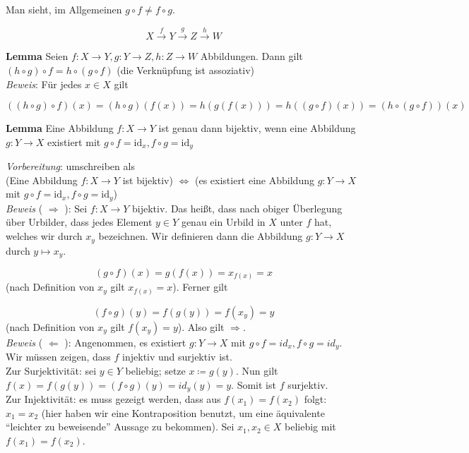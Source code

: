 \documentclass{article}
\begin{document}
Man sieht, im Allgemeinen $g \circ f \ne f \circ g$.

\[
  X \overset{f}\to Y \overset{g}\to Z \overset{h}\to W
\]

\textbf{Lemma} Seien $f \colon X \to Y, g \colon Y \to Z, h \colon Z \to W$ Abbildungen. Dann gilt
$(h \circ g) \circ f = h \circ (g \circ f)$ (die Verknüpfung ist assoziativ) \\

\emph{Beweis}: Für jedes $x \in X$ gilt

\[
  ((h \circ g) \circ f)(x) = (h \circ g)(f(x)) = h(g(f(x))) = h((g \circ f)(x)) = (h \circ (g \circ f))(x)
\]

\textbf{Lemma} Eine Abbildung $f \colon X \to Y$ ist genau dann bijektiv, wenn eine Abbildung $g \colon Y \to X$
existiert mit $g \circ f = \text{id}_x, f \circ g = \text{id}_y$

\emph{Vorbereitung}: umschreiben als \\
(Eine Abbildung $f \colon X \to Y$ ist bijektiv) $\iff$ (es existiert eine Abbildung $g \colon Y \to X$
mit $g \circ f = \text{id}_x, f \circ g = \text{id}_y$) \\

\emph{Beweis} ( $\Rightarrow$ ): Sei $f \colon X \to Y$ bijektiv. Das heißt, dass nach obiger Überlegung über Urbilder,
dass jedes Element $y \in Y$ genau ein Urbild in $X$ unter $f$ hat, welches wir durch $x_y$ bezeichnen.
Wir definieren dann die Abbildung $g \colon Y \to X$ durch $y \mapsto x_y$.

\[
  (g \circ f)(x) = g(f(x)) = x_{f(x)} = x
\]
(nach Definition von $x_y$ gilt $x_{f(x)} = x$). Ferner gilt

\[
  (f \circ g)(y) = f(g(y)) = f(x_y) = y
\]
(nach Definition von $x_y$ gilt $f(x_y) = y$). Also gilt $\Rightarrow$. \\

\emph{Beweis} ( $\Leftarrow$ ): Angenommen, es existiert $g: Y \to X$ mit $g \circ f = id_x, f \circ g = id_y$.
Wir müssen zeigen, dass $f$ injektiv und surjektiv ist.\\

Zur Surjektivität: sei $y \in Y$ beliebig; setze $x \coloneqq g(y)$.
Nun gilt $f(x) = f(g(y)) = (f \circ g)(y) = id_y(y) = y$. Somit ist $f$ surjektiv. \\

Zur Injektivität: es muss gezeigt werden, dass aus $f(x_1) = f(x_2)$ folgt: $x_1 = x_2$ (hier haben wir
eine Kontraposition benutzt, um eine äquivalente ``leichter zu beweisende'' Aussage zu bekommen).
Sei $x_1, x_2 \in X$ beliebig mit $f(x_1) = f(x_2)$.
\end{document}
